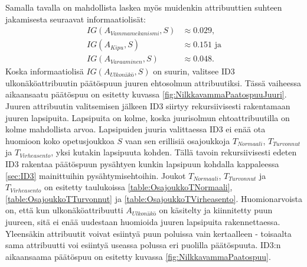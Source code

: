 \documentclass[12pt,finnish]{tktltiki2}
\theoremstyle{definition}
\theoremstyle{remark}
\begin{document}
Samalla tavalla on mahdollista laskea myös muidenkin attribuuttien suhteen jakamisesta seuraavat informaatiolisät:
\begin{equation*}
\begin{split}
IG(A_{Vammamekanismi},S) &\approx 0.029 \mbox{,}\\
IG(A_{Kipu},S) &\approx 0.151 \mbox{ ja}\\
IG(A_{Varaaminen},S) &\approx 0.048 \mbox{.}
\end{split}
\end{equation*}
Koska informaatiolisä $IG(A_{Ulkonäkö},S)$ on suurin, valitsee ID3 ulkonäköattribuutin päätöspuun juuren ehtosolmun attribuutiksi.
Tässä vaiheessa aikaansaatu päätöspuu on esitetty kuvassa \ref{fig:NilkkavammaPaatospuuJuuri}. Juuren attribuutin valitsemisen
jälkeen ID3 siirtyy rekursiivisesti rakentamaan juuren lapsipuita. Lapsipuita on kolme, koska juurisolmun ehtoattribuutilla
on kolme mahdollista arvoa. Lapsipuiden juuria valittaessa ID3 ei enää ota huomioon koko opetusjoukkoa $S$ vaan sen
erillisiä osajoukkoja $T_{Normaali}$, $T_{Turvonnut}$ ja $T_{Virheasento}$, yksi kutakin lapsipuuta kohden. Tällä tavoin
rekursiivisesti edeten ID3 rakentaa päätöspuun pysähtyen kunkin lapsipuun kohdalla kappaleessa \ref{sec:ID3}
mainittuihin pysähtymisehtoihin. Joukot $T_{Normaali}$, $T_{Turvonnut}$ ja $T_{Virheasento}$ on esitetty taulukoissa
\ref{table:OsajoukkoTNormaali}, \ref{table:OsajoukkoTTurvonnut} ja \ref{table:OsajoukkoTVirheasento}.
Huomionarvoista on, että kun ulkonäköattribuutti $A_{Ulkonäkö}$ on käsitelty ja kiinnitetty puun juureen, sitä ei enää
uudestaan huomioida juuren lapsipuita rakennettaessa. Yleensäkin attribuutit voivat esiintyä puun poluissa vain kertaalleen -
toisaalta sama attribuutti voi esiintyä useassa polussa eri puolilla päätöspuuta.
ID3:n aikaansaama päätöspuu on esitetty kuvassa \ref{fig:NilkkavammaPaatospuu}.
\end{document}
